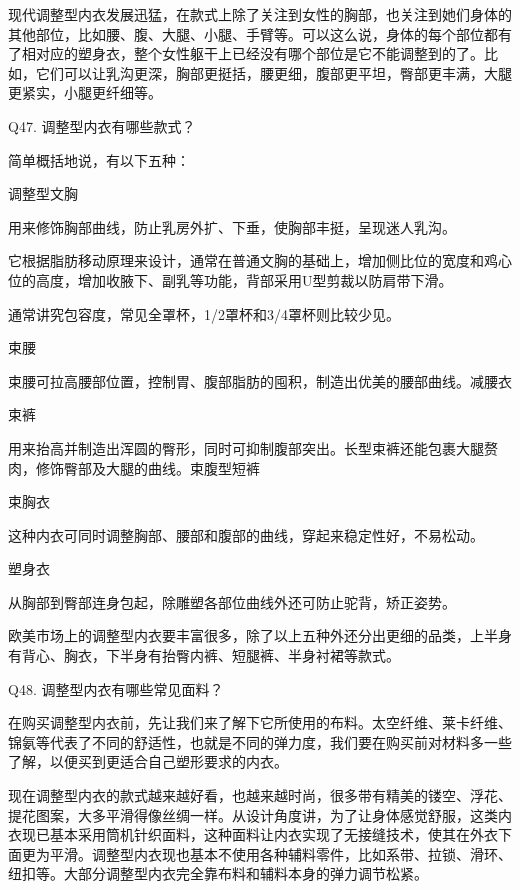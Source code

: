 \documentclass[12pt,UTF8]{ctexbook}
\begin{document}
现代调整型内衣发展迅猛，在款式上除了关注到女性的胸部，也关注到她们身体的其他部位，比如腰、腹、大腿、小腿、手臂等。可以这么说，身体的每个部位都有了相对应的塑身衣，整个女性躯干上已经没有哪个部位是它不能调整到的了。比如，它们可以让乳沟更深，胸部更挺括，腰更细，腹部更平坦，臀部更丰满，大腿更紧实，小腿更纤细等。





Q47. 调整型内衣有哪些款式？


简单概括地说，有以下五种：

调整型文胸

用来修饰胸部曲线，防止乳房外扩、下垂，使胸部丰挺，呈现迷人乳沟。



它根据脂肪移动原理来设计，通常在普通文胸的基础上，增加侧比位的宽度和鸡心位的高度，增加收腋下、副乳等功能，背部采用U型剪裁以防肩带下滑。

通常讲究包容度，常见全罩杯，1/2罩杯和3/4罩杯则比较少见。

束腰

束腰可拉高腰部位置，控制胃、腹部脂肪的囤积，制造出优美的腰部曲线。减腰衣



束裤

用来抬高并制造出浑圆的臀形，同时可抑制腹部突出。长型束裤还能包裹大腿赘肉，修饰臀部及大腿的曲线。束腹型短裤





束胸衣

这种内衣可同时调整胸部、腰部和腹部的曲线，穿起来稳定性好，不易松动。



塑身衣

从胸部到臀部连身包起，除雕塑各部位曲线外还可防止驼背，矫正姿势。



欧美市场上的调整型内衣要丰富很多，除了以上五种外还分出更细的品类，上半身有背心、胸衣，下半身有抬臀内裤、短腿裤、半身衬裙等款式。





Q48. 调整型内衣有哪些常见面料？


在购买调整型内衣前，先让我们来了解下它所使用的布料。太空纤维、莱卡纤维、锦氨等代表了不同的舒适性，也就是不同的弹力度，我们要在购买前对材料多一些了解，以便买到更适合自己塑形要求的内衣。

现在调整型内衣的款式越来越好看，也越来越时尚，很多带有精美的镂空、浮花、提花图案，大多平滑得像丝绸一样。从设计角度讲，为了让身体感觉舒服，这类内衣现已基本采用筒机针织面料，这种面料让内衣实现了无接缝技术，使其在外衣下面更为平滑。调整型内衣现也基本不使用各种辅料零件，比如系带、拉锁、滑环、纽扣等。大部分调整型内衣完全靠布料和辅料本身的弹力调节松紧。
\end{document}
